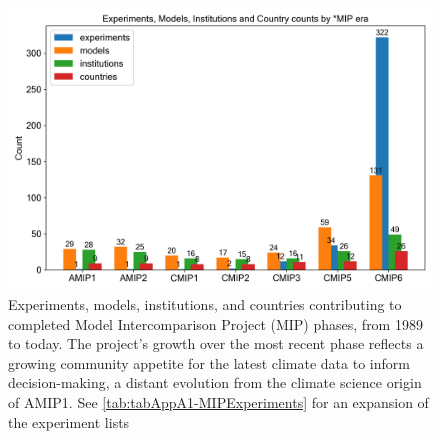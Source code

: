 \documentclass[gmd, preprint]{copernicus}
\begin{document}
\begin{figure}
    \centering
    \includegraphics[width=1\linewidth]{230512T112843_MIPEvolution-Counts.png}
    \caption{Experiments, models, institutions, and countries contributing to completed Model Intercomparison Project (MIP) phases, from 1989 to today. The project's growth over the most recent phase reflects a growing community appetite for the latest climate data to inform decision-making, a distant evolution from the climate science origin of AMIP1. See \autoref{tab:tabAppA1-MIPExperiments} for an expansion of the experiment lists}
    \label{fig:fig1-MIPGrowth}
\end{figure}
\end{document}
